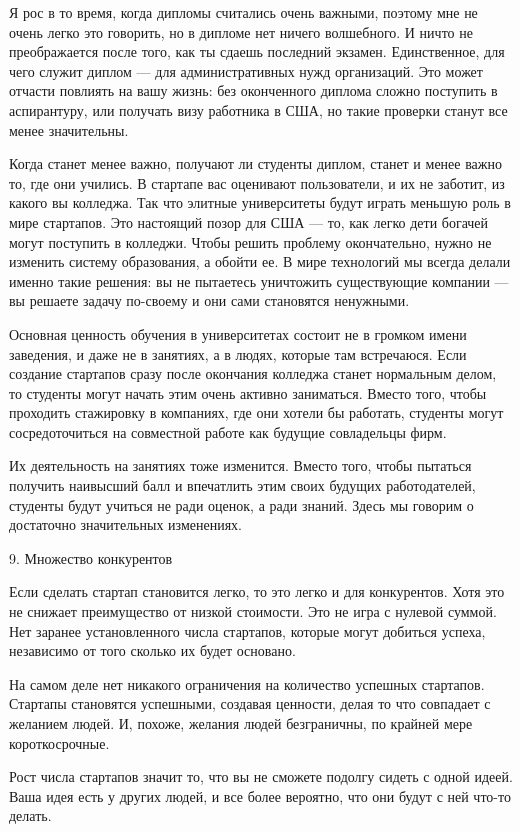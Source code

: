 \documentclass[ebook,12pt,oneside,openany]{memoir}
\begin{document}
Я рос в то время, когда дипломы считались очень важными, поэтому мне
не очень легко это говорить, но в дипломе нет ничего волшебного. И
ничто не преображается после того, как ты сдаешь последний экзамен.
Единственное, для чего служит диплом — для административных нужд
организаций. Это может отчасти повлиять на вашу жизнь: без оконченного
диплома сложно поступить в аспирантуру, или получать визу работника в
США, но такие проверки станут все менее значительны.

Когда станет менее важно, получают ли студенты диплом, станет и менее
важно то, где они учились. В стартапе вас оценивают пользователи, и их
не заботит, из какого вы колледжа. Так что элитные университеты будут
играть меньшую роль в мире стартапов. Это настоящий позор для США —
то, как легко дети богачей могут поступить в колледжи. Чтобы решить
проблему окончательно, нужно не изменить систему образования, а обойти
ее. В мире технологий мы всегда делали именно такие решения: вы не
пытаетесь уничтожить существующие компании — вы решаете задачу
по-своему и они сами становятся ненужными.

Основная ценность обучения в университетах состоит не в громком имени
заведения, и даже не в занятиях, а в людях, которые там встречаюся.
Если создание стартапов сразу после окончания колледжа станет
нормальным делом, то студенты могут начать этим очень активно
заниматься. Вместо того, чтобы проходить стажировку в компаниях, где
они хотели бы работать, студенты могут сосредоточиться на совместной
работе как будущие совладельцы фирм.

Их деятельность на занятиях тоже изменится. Вместо того, чтобы
пытаться получить наивысший балл и впечатлить этим своих будущих
работодателей, студенты будут учиться не ради оценок, а ради знаний.
Здесь мы говорим о достаточно значительных изменениях.

9. Множество конкурентов

Если сделать стартап становится легко, то это легко и для конкурентов.
Хотя это не снижает преимущество от низкой стоимости. Это не игра с
нулевой суммой. Нет заранее установленного числа стартапов, которые
могут добиться успеха, независимо от того сколько их будет основано.

На самом деле нет никакого ограничения на количество успешных
стартапов. Стартапы становятся успешными, создавая ценности, делая то
что совпадает с желанием людей. И, похоже, желания людей безграничны,
по крайней мере короткосрочные.

Рост числа стартапов значит то, что вы не сможете подолгу сидеть с
одной идеей. Ваша идея есть у других людей, и все более вероятно, что
они будут с ней что-то делать.
\end{document}
